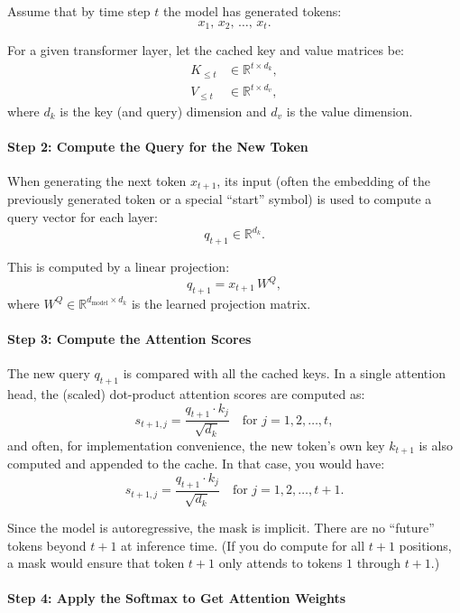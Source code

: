 Assume that by time step \( t \) the model has generated tokens:
\[
x_1,\, x_2,\, \dots,\, x_t.
\]

For a given transformer layer, let the cached key and value matrices be:
\[
\begin{aligned}
K_{\leq t} &\in \mathbb{R}^{t \times d_k}, \\
V_{\leq t} &\in \mathbb{R}^{t \times d_v},
\end{aligned}
\]
where \( d_k \) is the key (and query) dimension and \( d_v \) is the value dimension.

\paragraph{Step 2: Compute the Query for the New Token}

When generating the next token \( x_{t+1} \), its input (often the embedding of the previously generated token or a special “start” symbol) is used to compute a query vector for each layer:
\[
q_{t+1} \in \mathbb{R}^{d_k}.
\]

This is computed by a linear projection:
\[
q_{t+1} = x_{t+1} \, W^Q,
\]
where \( W^Q \in \mathbb{R}^{d_{\text{model}} \times d_k} \) is the learned projection matrix.

\paragraph{Step 3: Compute the Attention Scores}

The new query \( q_{t+1} \) is compared with all the cached keys. In a single attention head, the (scaled) dot-product attention scores are computed as:
\[
s_{t+1,j} = \frac{q_{t+1} \cdot k_j}{\sqrt{d_k}} \quad \text{for } j=1,2,\dots,t,
\]
and often, for implementation convenience, the new token's own key \( k_{t+1} \) is also computed and appended to the cache. In that case, you would have:
\[
s_{t+1,j} = \frac{q_{t+1} \cdot k_j}{\sqrt{d_k}} \quad \text{for } j=1,2,\dots,t+1.
\]

Since the model is autoregressive, the mask is implicit. There are no ``future'' tokens beyond \( t+1 \) at inference time. (If you do compute for all \( t+1 \) positions, a mask would ensure that token \( t+1 \) only attends to tokens \( 1 \) through \( t+1 \).)

\paragraph{Step 4: Apply the Softmax to Get Attention Weights}


